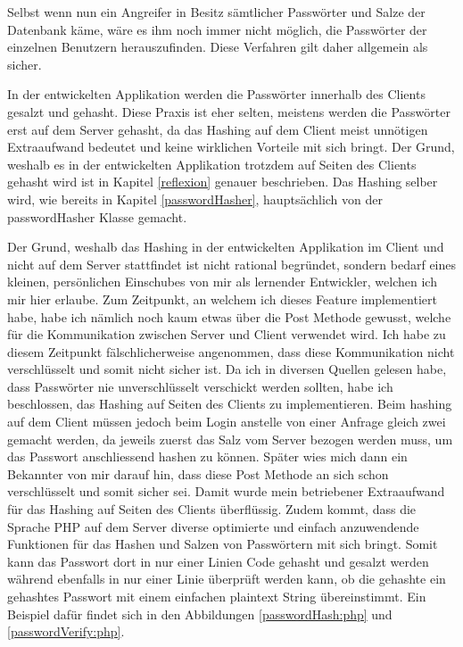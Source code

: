 \documentclass[a4paper,11pt]{report}
\begin{document}
		Selbst wenn nun ein Angreifer in Besitz sämtlicher Passwörter und Salze der Datenbank käme, wäre es ihm noch immer nicht möglich, die Passwörter der einzelnen Benutzern herauszufinden. Diese Verfahren gilt daher allgemein als sicher. \cite{defuse} \cite{security}
		
		In der entwickelten Applikation werden die Passwörter innerhalb des Clients gesalzt und gehasht. Diese Praxis ist eher selten, meistens werden die Passwörter erst auf dem Server gehasht, da das Hashing auf dem Client meist unnötigen Extraaufwand bedeutet und keine wirklichen Vorteile mit sich bringt. Der Grund, weshalb es in der entwickelten Applikation trotzdem auf Seiten des Clients gehasht wird ist in Kapitel \ref{reflexion} genauer beschrieben. Das Hashing selber wird, wie bereits in Kapitel \ref{passwordHasher}, hauptsächlich von der passwordHasher Klasse gemacht.
		
		Der Grund, weshalb das Hashing in der entwickelten Applikation im Client und nicht auf dem Server stattfindet ist nicht rational begründet, sondern bedarf eines kleinen, persönlichen Einschubes von mir als lernender Entwickler, welchen ich mir hier erlaube.
		Zum Zeitpunkt, an welchem ich dieses Feature implementiert habe, habe ich nämlich noch kaum etwas über die Post Methode gewusst, welche für die Kommunikation zwischen Server und Client verwendet wird. Ich habe zu diesem Zeitpunkt fälschlicherweise angenommen, dass diese Kommunikation nicht verschlüsselt und somit nicht sicher ist. Da ich in diversen Quellen gelesen habe, dass Passwörter nie unverschlüsselt verschickt werden sollten, habe ich beschlossen, das Hashing auf Seiten des Clients zu implementieren. Beim hashing auf dem Client müssen jedoch beim Login anstelle von einer Anfrage gleich zwei gemacht werden, da jeweils zuerst das Salz vom Server bezogen werden muss, um das Passwort anschliessend hashen zu können. Später wies mich dann ein Bekannter von mir darauf hin, dass diese Post Methode an sich schon verschlüsselt und somit sicher sei. Damit wurde mein betriebener Extraaufwand für das Hashing auf Seiten des Clients überflüssig. Zudem kommt, dass die Sprache PHP auf dem Server diverse optimierte und einfach anzuwendende Funktionen für das Hashen und Salzen von Passwörtern mit sich bringt. Somit kann das Passwort dort in nur einer Linien Code gehasht und gesalzt werden während ebenfalls in nur einer Linie überprüft werden kann, ob die gehashte ein gehashtes Passwort mit einem einfachen plaintext String übereinstimmt. Ein Beispiel dafür findet sich in den Abbildungen \ref{passwordHash:php} und \ref{passwordVerify:php}.
		
\end{document}
